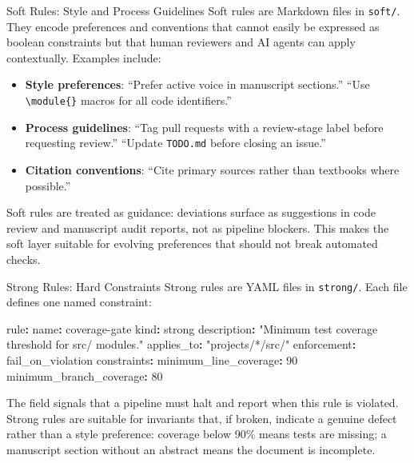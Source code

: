 \documentclass[
  ignorenonframetext,
]{beamer}
\newenvironment{Shaded}{}{}
\newcommand{\AttributeTok}[1]{\textcolor[rgb]{0.49,0.56,0.16}{#1}}
\newcommand{\DecValTok}[1]{\textcolor[rgb]{0.25,0.63,0.44}{#1}}
\newcommand{\FunctionTok}[1]{\textcolor[rgb]{0.02,0.16,0.49}{#1}}
\newcommand{\KeywordTok}[1]{\textcolor[rgb]{0.00,0.44,0.13}{\textbf{#1}}}
\newcommand{\StringTok}[1]{\textcolor[rgb]{0.25,0.44,0.63}{#1}}
\providecommand{\tightlist}{%
  \setlength{\itemsep}{0pt}\setlength{\parskip}{0pt}}
\begin{document}
\begin{frame}{Soft Rules: Style and Process
Guidelines}
\protect{}\label{soft-rules-style-and-process-guidelines}
Soft rules are Markdown files in \texttt{soft/}. They encode preferences
and conventions that cannot easily be expressed as boolean constraints
but that human reviewers and AI agents can apply contextually. Examples
include:

\begin{itemize}
\tightlist
\item
  \textbf{Style preferences}: ``Prefer active voice in manuscript
  sections.'' ``Use \texttt{\textbackslash{}module\{\}} macros for all
  code identifiers.''
\item
  \textbf{Process guidelines}: ``Tag pull requests with a review-stage
  label before requesting review.'' ``Update \texttt{TODO.md} before
  closing an issue.''
\item
  \textbf{Citation conventions}: ``Cite primary sources rather than
  textbooks where possible.''
\end{itemize}

Soft rules are treated as guidance: deviations surface as suggestions in
code review and manuscript audit reports, not as pipeline blockers. This
makes the soft layer suitable for evolving preferences that should not
break automated checks.
\end{frame}

\begin{frame}{Strong Rules: Hard Constraints}
\protect{}\label{strong-rules-hard-constraints}
Strong rules are YAML files in \texttt{strong/}. Each file defines one
named constraint:

\begin{Shaded}
\begin{Highlighting}[]
\FunctionTok{rule}\KeywordTok{:}
\AttributeTok{  }\FunctionTok{name}\KeywordTok{:}\AttributeTok{ coverage{-}gate}
\AttributeTok{  }\FunctionTok{kind}\KeywordTok{:}\AttributeTok{ strong}
\AttributeTok{  }\FunctionTok{description}\KeywordTok{:}\AttributeTok{ }\StringTok{"Minimum test coverage threshold for src/ modules."}
\AttributeTok{  }\FunctionTok{applies\_to}\KeywordTok{:}\AttributeTok{ }\StringTok{"projects/*/src/"}
\AttributeTok{  }\FunctionTok{enforcement}\KeywordTok{:}\AttributeTok{ fail\_on\_violation}
\AttributeTok{  }\FunctionTok{constraints}\KeywordTok{:}
\AttributeTok{    }\FunctionTok{minimum\_line\_coverage}\KeywordTok{:}\AttributeTok{ }\DecValTok{90}
\AttributeTok{    }\FunctionTok{minimum\_branch\_coverage}\KeywordTok{:}\AttributeTok{ }\DecValTok{80}
\end{Highlighting}
\end{Shaded}

The  field signals that a
pipeline must halt and report when this rule is violated. Strong rules
are suitable for invariants that, if broken, indicate a genuine defect
rather than a style preference: coverage below 90\% means tests are
missing; a manuscript section without an abstract means the document is
incomplete.
\end{frame}
\end{document}
